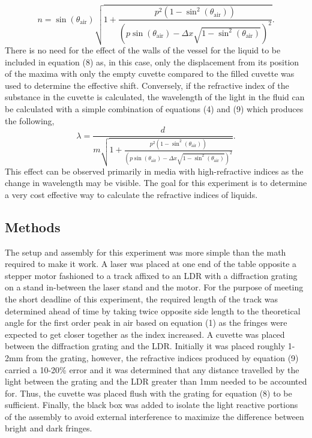 \documentclass[11pt]{article}
\begin{document}
\[ n = \sin \left( \theta_{ \text{air}} \right) \sqrt{ 1 +  \frac{p^2 \left( 1 - \sin^2 \left( \theta_{ \text{air}} \right) \right) }{ \left( p \sin \left( \theta_{ \text{air}} \right) - \Delta x \sqrt{ 1 - \sin^2 \left( \theta_{ \text{air}} \right)} \right) ^2}}. \tag{9}\]
There is no need for the effect of the walls of the vessel for the
liquid to be included in equation (8) as, in this case, only the
displacement from its position of the maxima with only the empty cuvette
compared to the filled cuvette was used to determine the effective
shift. Conversely, if the refractive index of the substance in the
cuvette is calculated, the wavelength of the light in the fluid can be
calculated with a simple combination of equations (4) and (9) which
produces the following,
\[ \lambda = \frac{d}{m \sqrt{ 1 +  \frac{p^2 \left( 1 - \sin^2 \left( \theta_{ \text{air}} \right) \right) }{ \left( p \sin \left( \theta_{ \text{air}} \right) - \Delta x \sqrt{ 1 - \sin^2 \left( \theta_{ \text{air}} \right)} \right) ^2}}}. \tag{10}\]
This effect can be observed primarily in media with high-refractive
indices as the change in wavelength may be visible. The goal for this
experiment is to determine a very cost effective way to calculate the
refractive indices of liquids.

    \hypertarget{methods}{%
\subsection{Methods}\label{methods}}

    The setup and assembly for this experiment was more simple than the math
required to make it work. A laser was placed at one end of the table
opposite a stepper motor fashioned to a track affixed to an LDR with a
diffraction grating on a stand in-between the laser stand and the motor.
For the purpose of meeting the short deadline of this experiment, the
required length of the track was determined ahead of time by taking
twice opposite side length to the theoretical angle for the first order
peak in air based on equation (1) as the fringes were expected to get
closer together as the index increased. A cuvette was placed between the
diffraction grating and the LDR. Initially it was placed roughly 1-2mm
from the grating, however, the refractive indices produced by equation
(9) carried a 10-20\% error and it was determined that any distance
travelled by the light between the grating and the LDR greater than 1mm
needed to be accounted for. Thus, the cuvette was placed flush with the
grating for equation (8) to be sufficient. Finally, the black box was
added to isolate the light reactive portions of the assembly to avoid
external interference to maximize the difference between bright and dark
fringes.
\end{document}
